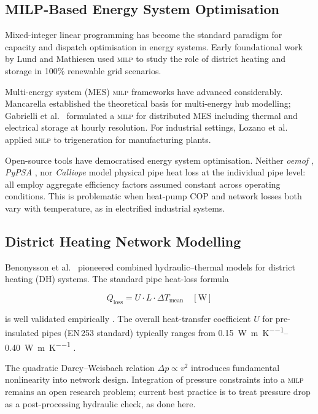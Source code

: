 \documentclass[a4paper,fleqn]{cas-sc}
\newcommand{\milp}{\textsc{milp}}
\begin{document}
\subsection{MILP-Based Energy System Optimisation}

Mixed-integer linear programming has become the standard paradigm for
capacity and dispatch optimisation in energy systems.  Early foundational
work by Lund and Mathiesen \cite{Lund2009} used \milp{} to study the role
of district heating and storage in 100\% renewable grid scenarios.

Multi-energy system (MES) \milp{} frameworks have advanced considerably.
Mancarella \cite{Mancarella2014} established the theoretical basis for
multi-energy hub modelling; Gabrielli et al.\ \cite{Gabrielli2018} formulated
a \milp{} for distributed MES including thermal and electrical storage at
hourly resolution.  For industrial settings, Lozano et al.\ \cite{Lozano2009}
applied \milp{} to trigeneration for manufacturing plants.

Open-source tools have democratised energy system optimisation.  Neither
\emph{oemof} \cite{Hilpert2018}, \emph{PyPSA} \cite{Brown2018}, nor
\emph{Calliope} \cite{Pfenninger2018} model physical pipe heat loss at the
individual pipe level: all employ aggregate efficiency factors assumed constant
across operating conditions.  This is problematic when heat-pump COP and
network losses both vary with temperature, as in electrified industrial
systems.

\subsection{District Heating Network Modelling}

Benonysson et al.\ \cite{Benonysson1995} pioneered combined hydraulic--thermal
models for district heating (DH) systems.  The standard pipe heat-loss formula

\begin{equation}
  Q_{\mathrm{loss}} = U \cdot L \cdot \Delta T_{\mathrm{mean}} \quad [\si{\watt}]
  \label{eq:pipe_loss}
\end{equation}

\noindent is well validated empirically \cite{Frederiksen2013}.  The overall
heat-transfer coefficient $U$ for pre-insulated pipes (EN\,253 standard)
typically ranges from \SIrange{0.15}{0.40}{\watt\per\metre\per\kelvin}
\cite{vanderHeijde2017}.

The quadratic Darcy--Weisbach relation $\Delta p \propto v^2$ introduces
fundamental nonlinearity into network design.  Integration of pressure
constraints into a \milp{} remains an open research problem; current best
practice is to treat pressure drop as a post-processing hydraulic check, as
done here.
\end{document}
